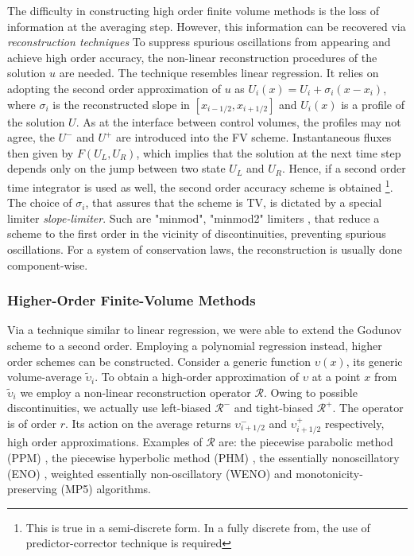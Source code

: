 \documentclass[11pt,a4paper,headinclude=true,DIV=14,BCOR=8mm,chapterprefix,listof=totoc,twoside,openright,abstracton]{scrbook}
\begin{document}
The difficulty in constructing high order finite volume methods is the loss of information at the averaging step. However, this information can be recovered via \textit{reconstruction techniques} To suppress spurious oscillations from appearing and achieve high order accuracy, the non-linear reconstruction procedures of the solution $u$ are needed. The technique resembles linear regression. It relies on adopting the second order approximation of $u$ as $U_i(x) = U_i + \sigma_i(x-x_i)$, where $\sigma_i$ is the reconstructed slope in $[x_{i-1/2},x_{i+1/2}]$ and $U_i(x)$ is a profile of the solution $U$. As at the interface between control volumes, the profiles may not agree, the $U^{-}$ and $U^{+}$ are introduced into the FV scheme. Instantaneous fluxes then given by $F(U_L, U_R)$, which implies that the solution at the next time step depends only on the jump between two state $U_L$ and $U_R$. Hence, if a second order time integrator is used as well, the second order accuracy scheme is obtained \footnote{This is true in a semi-discrete form. In a fully discrete from, the use of predictor-corrector technique is required}. The choice of $\sigma_i$, that assures that the scheme is TV, is dictated by a special limiter \textit{slope-limiter}. Such are "minmod", "minmod2" limiters \cite{LeVeque:1992}, that reduce a scheme to the first order in the vicinity of discontinuities, preventing spurious oscillations. For a system of conservation laws, the reconstruction is usually done component-wise.


\subsubsection{Higher-Order Finite-Volume Methods}

Via a technique similar to linear regression, we were able to extend the Godunov scheme to a second order. Employing a polynomial regression instead, higher order schemes can be constructed. Consider a generic function $\upsilon(x)$, its generic volume-average $\widetilde{\upsilon}_i$. To obtain a high-order approximation of $\upsilon$ at a point $x$ from $\widetilde{\upsilon}_i$ we employ a non-linear reconstruction operator $\mathcal{R}$. Owing to possible discontinuities, we actually use left-biased $\mathcal{R}^-$ and tight-biased $\mathcal{R}^+$. The operator is of order $r$. Its action on the average returns 
$\upsilon^{-}_{i+1/2}$ and $\upsilon^{+}_{i+1/2}$ respectively, high order approximations. Examples of $\mathcal{R}$ are: the piecewise parabolic method (PPM) \cite{Colella:1984,Colella:2008}, the piecewise hyperbolic method (PHM) \cite{Marquina:1994}, the essentially nonoscillatory (ENO) \cite{Harten:1987,Shu:1988,Shu:1989}, weighted essentially non-oscillatory (WENO) \cite{Liu:1994,Jiang:1996} and monotonicity-preserving (MP5) \cite{Suresh:1997} algorithms. 
\end{document}
